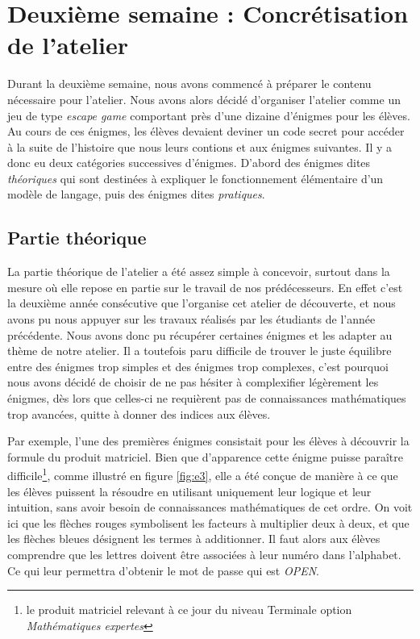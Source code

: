 \section{Deuxième semaine : Concrétisation de l'atelier}

  Durant la deuxième semaine, nous avons commencé à préparer le contenu nécessaire pour l'atelier. Nous avons alors décidé d’organiser l'atelier comme un jeu de type \textit{escape game} comportant près d'une dizaine d'énigmes pour les élèves. Au cours de ces énigmes, les élèves devaient deviner un code secret pour accéder à la suite de l'histoire que nous leurs contions et aux énigmes suivantes. Il y a donc eu deux catégories successives d'énigmes. D'abord des énigmes dites \textit{théoriques} qui sont destinées à expliquer le fonctionnement élémentaire d'un modèle de langage, puis des énigmes dites \textit{pratiques}.


\subsection{Partie théorique}

  La partie théorique de l'atelier a été assez simple à concevoir, surtout dans la mesure où elle repose en partie sur le travail de nos prédécesseurs. En effet c'est la deuxième année consécutive que l'\enseirb organise cet atelier de découverte, et nous avons pu nous appuyer sur les travaux réalisés par les étudiants de l'année précédente. Nous avons donc pu récupérer certaines énigmes et les adapter au thème de notre atelier. Il a toutefois paru difficile de trouver le juste équilibre entre des énigmes trop simples et des énigmes trop complexes, c'est pourquoi nous avons décidé de choisir de ne pas hésiter à complexifier légèrement les énigmes, dès lors que celles-ci ne requièrent pas de connaissances mathématiques trop avancées, quitte à donner des indices aux élèves.

  Par exemple, l'une des premières énigmes consistait pour les élèves à découvrir la formule du produit matriciel. Bien que d'apparence cette énigme puisse paraître difficile\footnote{le produit matriciel relevant à ce jour du niveau Terminale option \textit{Mathématiques expertes}}, comme illustré en figure \ref{fig:e3}, elle a été conçue de manière à ce que les élèves puissent la résoudre en utilisant uniquement leur logique et leur intuition, sans avoir besoin de connaissances mathématiques de cet ordre. On voit ici que les flèches rouges symbolisent les facteurs à multiplier deux à deux, et que les flèches bleues désignent les termes à additionner. Il faut alors aux élèves comprendre que les lettres doivent être associées à leur numéro dans l'alphabet. Ce qui leur permettra d'obtenir le mot de passe qui est \textit{OPEN}.\par

